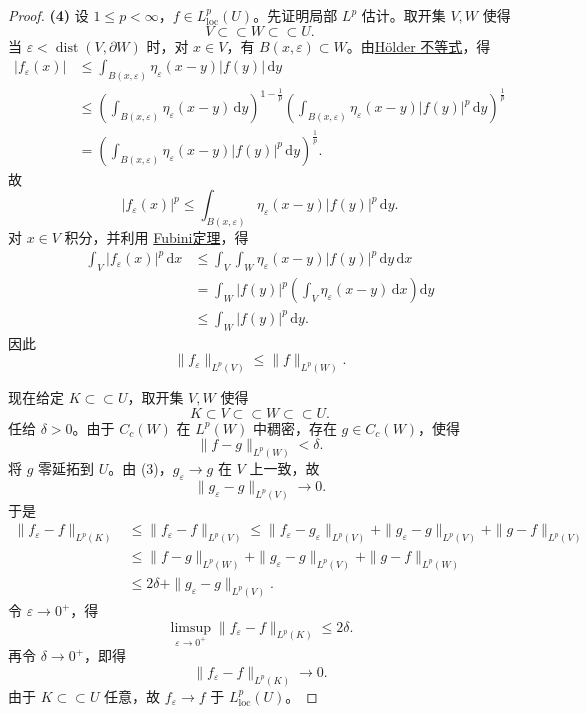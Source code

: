 \documentclass[../main.tex]{subfiles}
\begin{document}
\begin{proof}
\textbf{(4)}
设 \(1\leqslant p<\infty\)，\(f\in L^p_{\mathrm{loc}}(U)\)。先证明局部 \(L^p\) 估计。取开集 \(V,W\) 使得
\[
V\subset\subset W\subset\subset U.
\]
当 \(\varepsilon<\operatorname{dist}(V,\partial W)\) 时，对 \(x\in V\)，有 \(B(x,\varepsilon)\subset W\)。由\hyperref[Real Analysis-theorem:实变函数--Hölder不等式]{Hölder 不等式}，得
\[
\begin{aligned}
|f_\varepsilon(x)|
&\leqslant \int_{B(x,\varepsilon)}\eta_\varepsilon(x-y)|f(y)|\,\mathrm dy\\
&\leqslant \left(\int_{B(x,\varepsilon)}\eta_\varepsilon(x-y)\,\mathrm dy\right)^{1-\frac{1}{p}}
\left(\int_{B(x,\varepsilon)}\eta_\varepsilon(x-y)|f(y)|^p\,\mathrm dy\right)^{\frac{1}{p}}\\
&=\left(\int_{B(x,\varepsilon)}\eta_\varepsilon(x-y)|f(y)|^p\,\mathrm dy\right)^{\frac{1}{p}}.
\end{aligned}
\]
故
\[
|f_\varepsilon(x)|^p
\leqslant \int_{B(x,\varepsilon)}\eta_\varepsilon(x-y)|f(y)|^p\,\mathrm dy.
\]
对 \(x\in V\) 积分，并利用 \hyperref[Real Analysis-theorem:实变函数-Fubini定理]{Fubini定理}，得
\[
\begin{aligned}
\int_V |f_\varepsilon(x)|^p\,\mathrm dx
&\leqslant \int_V\int_W \eta_\varepsilon(x-y)|f(y)|^p\,\mathrm dy\,\mathrm dx\\
&=\int_W |f(y)|^p\left(\int_V \eta_\varepsilon(x-y)\,\mathrm dx\right)\mathrm dy\\
&\leqslant \int_W |f(y)|^p\,\mathrm dy.
\end{aligned}
\]
因此
\[
\|f_\varepsilon\|_{L^p(V)}\leqslant \|f\|_{L^p(W)}.
\]

现在给定 \(K\subset\subset U\)，取开集 \(V,W\) 使得
\[
K\subset V\subset\subset W\subset\subset U.
\]
任给 \(\delta>0\)。由于 \(C_c(W)\) 在 \(L^p(W)\) 中稠密，存在 \(g\in C_c(W)\)，使得
\[
\|f-g\|_{L^p(W)}<\delta.
\]
将 \(g\) 零延拓到 \(U\)。由 (3)，\(g_\varepsilon\to g\) 在 \(V\) 上一致，故
\[
\|g_\varepsilon-g\|_{L^p(V)}\to0.
\]
于是
\[
\begin{aligned}
\|f_\varepsilon-f\|_{L^p(K)}
&\leqslant \|f_\varepsilon-f\|_{L^p(V)}\leqslant \|f_\varepsilon-g_\varepsilon\|_{L^p(V)}
+\|g_\varepsilon-g\|_{L^p(V)}
+\|g-f\|_{L^p(V)}\\
&\leqslant \|f-g\|_{L^p(W)}
+\|g_\varepsilon-g\|_{L^p(V)}
+\|g-f\|_{L^p(W)}\\
&\leqslant 2\delta+\|g_\varepsilon-g\|_{L^p(V)}.
\end{aligned}
\]
令 \(\varepsilon\to0^+\)，得
\[
\limsup_{\varepsilon\to0^+}\|f_\varepsilon-f\|_{L^p(K)}\leqslant 2\delta.
\]
再令 \(\delta\to0^+\)，即得
\[
\|f_\varepsilon-f\|_{L^p(K)}\to0.
\]
由于 \(K\subset\subset U\) 任意，故 \(f_\varepsilon\to f\) 于 \(L^p_{\mathrm{loc}}(U)\)。


\end{proof}
\end{document}

